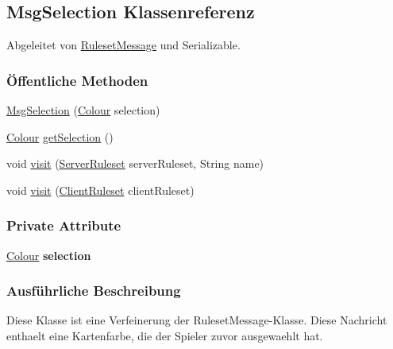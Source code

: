\hypertarget{a00050}{\subsection{Msg\-Selection Klassenreferenz}
\label{a00050}
}


Abgeleitet von \hyperlink{a00053}{Ruleset\-Message} und Serializable.

\subsubsection*{Öffentliche Methoden}
\begin{DoxyCompactItemize}
\item 
\hyperlink{a00050_ae235e5d0b7fe2131872304596d58c505}{Msg\-Selection} (\hyperlink{a00058}{Colour} selection)
\item 
\hyperlink{a00058}{Colour} \hyperlink{a00050_a8a4d9d241db3d77df7033bf8684b4c54}{get\-Selection} ()
\item 
void \hyperlink{a00050_ab45288da8f64e79408f1effd5579b5c2}{visit} (\hyperlink{a00068}{Server\-Ruleset} server\-Ruleset, String name)
\item 
void \hyperlink{a00050_acb5be722a2d1c9110d39f31c6e18f6e7}{visit} (\hyperlink{a00056}{Client\-Ruleset} client\-Ruleset)
\end{DoxyCompactItemize}
\subsubsection*{Private Attribute}
\begin{DoxyCompactItemize}
\item 
\hypertarget{a00050_a2eb44d24e6a391432522cbe2a4045f2e}{\hyperlink{a00058}{Colour} {\bfseries selection}}\label{a00050_a2eb44d24e6a391432522cbe2a4045f2e}

\end{DoxyCompactItemize}


\subsubsection{Ausführliche Beschreibung}
Diese Klasse ist eine Verfeinerung der Ruleset\-Message-\/\-Klasse. Diese Nachricht enthaelt eine Kartenfarbe, die der Spieler zuvor ausgewaehlt hat. 

